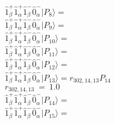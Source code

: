 \documentclass[14pt]{article}
\begin{document}
    $ \hat{1}_{\beta}^{+}\hat{1}_{\alpha}^{+}\hat{1}_{\beta}^{-}\hat{0}_{\alpha}^{-} \vert{P_{8}}\rangle =  $ \\ 
    $ \hat{1}_{\beta}^{+}\hat{1}_{\alpha}^{+}\hat{1}_{\beta}^{-}\hat{0}_{\alpha}^{-} \vert{P_{9}}\rangle =  $ \\ 
    $ \hat{1}_{\beta}^{+}\hat{1}_{\alpha}^{+}\hat{1}_{\beta}^{-}\hat{0}_{\alpha}^{-} \vert{P_{10}}\rangle =  $ \\ 
    $ \hat{1}_{\beta}^{+}\hat{1}_{\alpha}^{+}\hat{1}_{\beta}^{-}\hat{0}_{\alpha}^{-} \vert{P_{11}}\rangle =  $ \\ 
    $ \hat{1}_{\beta}^{+}\hat{1}_{\alpha}^{+}\hat{1}_{\beta}^{-}\hat{0}_{\alpha}^{-} \vert{P_{12}}\rangle =  $ \\ 
    $ \hat{1}_{\beta}^{+}\hat{1}_{\alpha}^{+}\hat{1}_{\beta}^{-}\hat{0}_{\alpha}^{-} \vert{P_{13}}\rangle = {r}_{302,14,13}P_{14} $ \\ 
    ${r}_{302,14,13}\ =\ 1.0 $ \\ 
    $ \hat{1}_{\beta}^{+}\hat{1}_{\alpha}^{+}\hat{1}_{\beta}^{-}\hat{0}_{\alpha}^{-} \vert{P_{14}}\rangle =  $ \\ 
    $ \hat{1}_{\beta}^{+}\hat{1}_{\alpha}^{+}\hat{1}_{\beta}^{-}\hat{0}_{\alpha}^{-} \vert{P_{15}}\rangle =  $ \\ 
    
\end{document}
